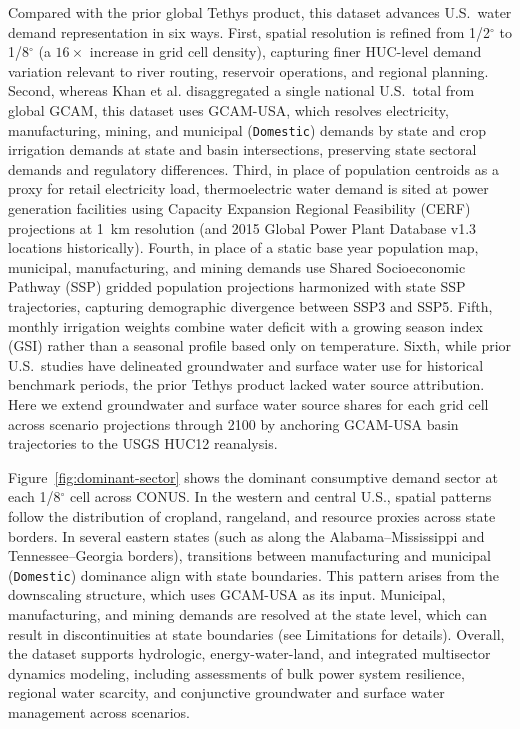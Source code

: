 \documentclass[fleqn,10pt]{wlscirep}
\begin{document}
Compared with the prior global Tethys product\cite{Khan2023}, this dataset advances U.S.\ water demand representation in six ways. First, spatial resolution is refined from 1/2$^{\circ}$ to 1/8$^{\circ}$ (a $16\times$ increase in grid cell density), capturing finer HUC-level demand variation relevant to river routing, reservoir operations, and regional planning. Second, whereas Khan et al.\cite{Khan2023} disaggregated a single national U.S.\ total from global GCAM, this dataset uses GCAM-USA\cite{Zhao_gcamusa_water,Zhao2024,Calvin2019GCAM,Binsted_2022}, which resolves electricity, manufacturing, mining, and municipal (\texttt{Domestic}) demands by state and crop irrigation demands at state and basin intersections, preserving state sectoral demands and regulatory differences. Third, in place of population centroids as a proxy for retail electricity load\cite{Khan2023}, thermoelectric water demand is sited at power generation facilities using Capacity Expansion Regional Feasibility (CERF)\cite{Vernon2021,Vernon2023GRIDCERF,Mongird2025CERF} projections at 1~km resolution (and 2015 Global Power Plant Database v1.3 locations\cite{globalpowerplantdb} historically). Fourth, in place of a static base year population map\cite{Khan2023}, municipal, manufacturing, and mining demands use Shared Socioeconomic Pathway (SSP) gridded population projections\cite{Jones_2016,Jones2020SEDAC} harmonized with state SSP trajectories\cite{Zoraghein2020Zenodo}, capturing demographic divergence between SSP3 and SSP5. Fifth, monthly irrigation weights combine water deficit with a growing season index (GSI) rather than a seasonal profile based only on temperature\cite{Khan2023}. Sixth, while prior U.S.\ studies have delineated groundwater and surface water use for historical benchmark periods\cite{Marston2018WRR,Dieter2018USGS,Stets2025USGS}, the prior Tethys product\cite{Khan2023} lacked water source attribution. Here we extend groundwater and surface water source shares for each grid cell across scenario projections through 2100 by anchoring GCAM-USA basin trajectories to the USGS HUC12 reanalysis\cite{Stets2025USGS}.

Figure~\ref{fig:dominant-sector} shows the dominant consumptive demand sector at each 1/8$^{\circ}$ cell across CONUS. In the western and central U.S., spatial patterns follow the distribution of cropland, rangeland, and resource proxies across state borders. In several eastern states (such as along the Alabama--Mississippi and Tennessee--Georgia borders), transitions between manufacturing and municipal (\texttt{Domestic}) dominance align with state boundaries. This pattern arises from the downscaling structure, which uses GCAM-USA as its input. Municipal, manufacturing, and mining demands are resolved at the state level, which can result in discontinuities at state boundaries (see Limitations for details). Overall, the dataset supports hydrologic, energy-water-land, and integrated multisector dynamics modeling, including assessments of bulk power system resilience, regional water scarcity, and conjunctive groundwater and surface water management across scenarios.
\end{document}
